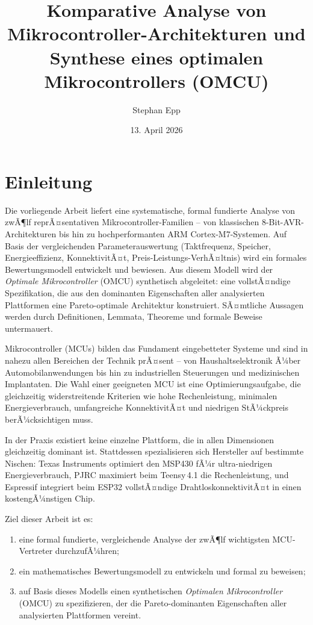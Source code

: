﻿\documentclass[12pt, a4paper]{article}
\title{Komparative Analyse von Mikrocontroller-Architekturen und Synthese eines optimalen Mikrocontrollers (OMCU)}
\author{Stephan Epp}
\date{13. April 2026}
\theoremstyle{plain}
\theoremstyle{definition}
\theoremstyle{remark}
\newcommand{\omcu}{\textsc{OMCU}}
\newcommand{\arm}{\textsc{ARM}}
\begin{document}
\maketitle
\tableofcontents
\newpage

\section{Einleitung}
\label{sec:einleitung}
    Die vorliegende Arbeit liefert eine systematische, formal fundierte Analyse
von zwÃ¶lf reprÃ¤sentativen Mikrocontroller-Familien -- von klassischen
8-Bit-\textsc{AVR}-Architekturen bis hin zu hochperformanten
\arm{} Cortex-M7-Systemen.
Auf Basis der vergleichenden Parameterauswertung (Taktfrequenz, Speicher,
Energieeffizienz, KonnektivitÃ¤t, Preis-Leistungs-VerhÃ¤ltnis) wird ein
formales Bewertungsmodell entwickelt und bewiesen.
Aus diesem Modell wird der \emph{Optimale Mikrocontroller} (\omcu{})
synthetisch abgeleitet: eine vollstÃ¤ndige Spezifikation, die aus den
dominanten Eigenschaften aller analysierten Plattformen eine
Pareto-optimale Architektur konstruiert.
SÃ¤mtliche Aussagen werden durch Definitionen, Lemmata, Theoreme und
formale Beweise untermauert.

Mikrocontroller (MCUs) bilden das Fundament eingebetteter Systeme und sind in
nahezu allen Bereichen der Technik prÃ¤sent -- von Haushaltselektronik Ã¼ber
Automobilanwendungen bis hin zu industriellen Steuerungen und medizinischen
Implantaten.
Die Wahl einer geeigneten MCU ist eine Optimierungsaufgabe, die gleichzeitig
widerstreitende Kriterien wie hohe Rechenleistung, minimalen Energieverbrauch,
umfangreiche KonnektivitÃ¤t und niedrigen StÃ¼ckpreis berÃ¼cksichtigen muss.

In der Praxis existiert keine einzelne Plattform, die in allen Dimensionen
gleichzeitig dominant ist.
Stattdessen spezialisieren sich Hersteller auf bestimmte Nischen:
Texas Instruments optimiert den MSP430 fÃ¼r ultra-niedrigen Energieverbrauch,
PJRC maximiert beim Teensy\,4.1 die Rechenleistung, und Espressif integriert
beim ESP32 vollstÃ¤ndige DrahtloskonnektivitÃ¤t in einen kostengÃ¼nstigen Chip.

Ziel dieser Arbeit ist es:
\begin{enumerate}[label=(\roman*)]
  \item eine formal fundierte, vergleichende Analyse der zwÃ¶lf wichtigsten
        MCU-Vertreter durchzufÃ¼hren;
  \item ein mathematisches Bewertungsmodell zu entwickeln und formal zu beweisen;
  \item auf Basis dieses Modells einen synthetischen \emph{Optimalen
        Mikrocontroller} (\omcu{}) zu spezifizieren, der die Pareto-dominanten
        Eigenschaften aller analysierten Plattformen vereint.
\end{enumerate}
\end{document}
